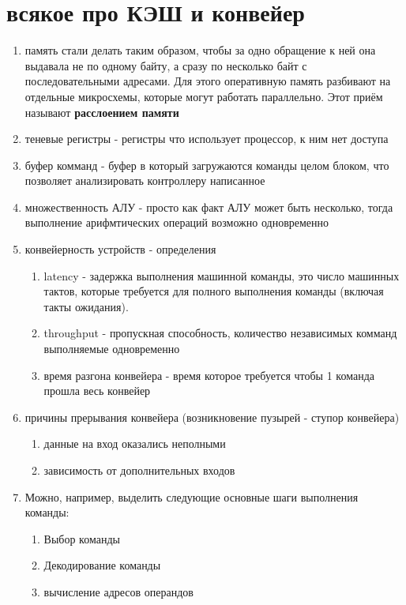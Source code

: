 \documentclass[a4paper,10pt]{article}
\begin{document}
\section*{всякое про КЭШ и конвейер}
\begin{enumerate}
    \item память стали делать таким образом, чтобы за одно обращение к ней она выдавала не по одному байту, а сразу по несколько байт с последовательными адресами. Для этого оперативную память разбивают на отдельные микросхемы, которые могут работать параллельно. Этот приём называют \textbf{расслоением памяти}
    \item теневые регистры - регистры что использует процессор, к ним нет доступа
    \item буфер комманд - буфер в который загружаются команды целом блоком, что позволяет анализировать контроллеру написанное
    \item множественность АЛУ - просто как факт АЛУ может быть несколько, тогда выполнение арифмтических операций возможно одновременно
    \item конвейерность устройств - определения
    \begin{enumerate}
        \item latency - задержка выполнения машинной команды, это число машинных тактов, которые требуется для полного выполнения команды (включая такты ожидания).
        \item throughput - пропускная способность, количество независимых комманд выполняемые одновременно
        \item время разгона конвейера - время которое требуется чтобы 1 команда прошла весь конвейер
    \end{enumerate}
    \item причины прерывания конвейера (возникновение пузырей - ступор конвейера)
    \begin{enumerate}
        \item данные на вход оказались неполными
        \item зависимость от дополнительных входов
    \end{enumerate}
    \item Можно, например, выделить следующие основные шаги выполнения команды:
    \begin{enumerate}
        \item Выбор команды
        \item Декодирование команды
        \item вычисление адресов операндов

\end{enumerate}
\end{enumerate}
\end{document}
